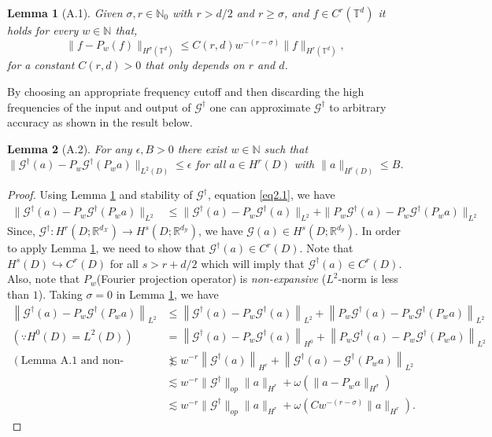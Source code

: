 \documentclass[reqno,10pt]{amsart}
\theoremstyle{plain}
\newtheorem*{lem*}{Lemma}
\theoremstyle{definition}
\newcommand{\bb}[1]{\mathbb{#1}}
\newcommand{\cal}[1]{\mathcal{#1}}
\begin{document}
    \begin{lem*}[A.1] \label{lemA1}
        Given $\sigma, r \in \bb N_0$ with $r > d/2$ and $r \geq \sigma$, and $f \in C^r(\bb T^d)$ it holds for every $w \in \bb N$ that, 
        \begin{equation}
            \|f - P_w(f)\|_{H^\sigma(\bb T^d)} \leq C(r,d)w^{-(r-\sigma)}\|f\|_{H^r(\bb T^d)},
        \end{equation}
        for a constant $C(r,d) > 0$ that only depends on $r$ and $d$.
    \end{lem*}
    By choosing an appropriate frequency cutoff and then discarding the high frequencies of the input and output of $\cal G^\dag$ one can approximate $\cal G^\dag$ to arbitrary accuracy as shown in the result below.
    
    \begin{lem*}[A.2]
        For any $\epsilon, B > 0$ there exist $w \in \bb N$ such that $\|\cal G^\dag(a) - P_w\cal G^\dag(P_wa)\|_{L^2(D)} \leq \epsilon$ for all $a \in H^r(D)$ with $\|a\|_{H^r(D)} \leq B$.        
    \end{lem*}
    \begin{proof}
        Using Lemma \ref{lemA1} and stability of $\cal G^\dag$, equation \ref{eq2.1}, we have
        $$
        \begin{aligned}
            \|\cal G^\dag(a) - P_w\cal G^\dag(P_wa)\|_{L^2} &\leq \|\cal G^\dag(a) - P_w\cal G^\dag(a)\|_{L^2} + \|P_w\cal G^\dag(a) - P_w\cal G^\dag(P_wa)\|_{L^2}
        \end{aligned}
        $$
        Since, $\cal G^\dag : H^r(D;\bb R^{d_{\cal X}}) \to H^s(D;\bb R^{d_{\cal Y}})$, we have $\cal G(a) \in H^s(D;\bb R^{d_{\cal Y}})$. In order to apply Lemma \ref{lemA1}, we need to show that $\cal G^\dag(a) \in C^r(D)$. Note that $H^s(D) \hookrightarrow C^r(D)$ for all $s > r + d/2$ which will imply that $\cal G^\dag (a) \in C^r(D)$. Also, note that $P_w$(Fourier projection operator) is {\it non-expansive} ($L^2$-norm is less than $1$). Taking $\sigma = 0$ in Lemma \ref{lemA1}, we have 
        \begin{equation}            
        \begin{aligned}
            \left\|\cal G^\dag(a) - P_w\cal G^\dag(P_wa)\right\|_{L^2} &\leq \left\|\cal G^\dag(a) - P_w\cal G^\dag(a)\right\|_{L^2} + \left\|P_w\cal G^\dag(a) - P_w\cal G^\dag(P_wa)\right\|_{L^2} \\
            (\because H^0(D) = L^2(D)) \qquad &= \left\|\cal G^\dag(a) - P_w\cal G^\dag(a)\right\|_{H^0} + \left\|P_w\cal G^\dag(a) - P_w\cal G^\dag(P_wa)\right\|_{L^2}\\
            (\text{Lemma A.1 and non-expansive}) \qquad &\lesssim w^{-r} \left\|\cal G^\dag (a)\right\|_{H^r} + \left\|\cal G^\dag (a) - \cal G^\dag(P_wa)\right\|_{L^2}\\
            &\lesssim w^{-r}\|\cal G^\dag\|_{op}\|a\|_{H^r} + \omega(\|a - P_wa\|_{H^\sigma})\\
            &\lesssim w^{-r}\|\cal G^\dag\|_{op}\|a\|_{H^r} + \omega (Cw^{-(r-\sigma)}\|a\|_{H^r}).
        \end{aligned}
    \end{equation}
    \end{proof}
\end{document}
